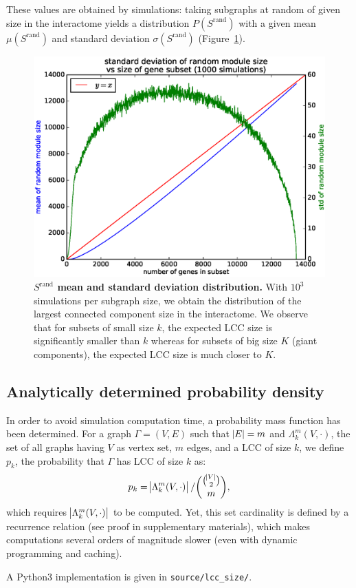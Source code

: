 \documentclass[letterpaper]{article}
\begin{document}
	These values are obtained by simulations: taking subgraphs at random of given size in the interactome yields a
	distribution $P(S^{\text{rand}})$ with a given mean $\mu(S^{\text{rand}})$ and standard deviation $\sigma(S^{\text{rand}})$
	(Figure~\ref{fig:Srand distribution}).

	\begin{figure}[!h]\centering
		\includegraphics[width=.45\textwidth]{images/Srand_distribution_1000_sims.eps}
		\caption{{\bf $S^{\text{rand}}$ mean and standard deviation distribution.}
		With $10^3$ simulations per subgraph size, we obtain the distribution of the largest connected component size
		in the interactome. We observe that for subsets of small size $k$, the expected LCC size is significantly smaller than $k$
		whereas for subsets of big size $K$ (giant components), the expected LCC size is much closer to $K$.
		\label{fig:Srand distribution}}
	\end{figure}

	\subsection{Analytically determined probability density}
	In order to avoid simulation computation time, a probability mass function has been determined. For a graph $\Gamma = (V, E)$
	such that $\abs E = m$ and $\Lambda_k^m(V, \cdot)$, the set of all graphs having $V$ as vertex set, $m$ edges, and a LCC of size $k$,
	we define $p_k$, the probability that $\Gamma$ has LCC of size $k$ as:
	\begin{equation}
		p_k = \abs {\Lambda_k^m(V, \cdot)}/\binom {\binom {\abs V}2}m,
	\end{equation}
	which requires $\abs {\Lambda_k^m(V, \cdot)}$ to be computed. Yet, this set cardinality is defined by a recurrence relation
	(see proof in supplementary materials), which makes computations several orders of magnitude slower (even with dynamic programming
	and caching).

	A Python3 implementation is given in \texttt{source/lcc\_size/}.
\end{document}

